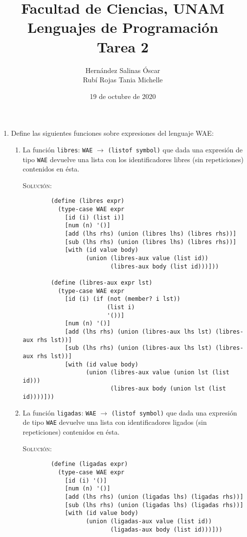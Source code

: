 \documentclass[letterpaper,11pt]{article}
\title{Facultad de Ciencias, UNAM \\ 
       Lenguajes de Programación \\ 
       Tarea 2}
\author{Hernández Salinas Óscar \\ 
        Rubí Rojas Tania Michelle }
\date{19 de octubre de 2020}
\begin{document}
\maketitle

\begin{enumerate}
    \item Define las siguientes funciones sobre expresiones del lenguaje WAE:
    \begin{enumerate}
        \item La función \texttt{libres}: \texttt{WAE} $\rightarrow$ 
        \texttt{(listof symbol)} que dada una expresión de tipo
        \texttt{WAE} devuelve una lista con los identificadores libres (sin 
        repeticiones) contenidos en ésta.

        \textsc{Solución:}
        \begin{verbatim}
        (define (libres expr)
          (type-case WAE expr
            [id (i) (list i)]
            [num (n) '()]
            [add (lhs rhs) (union (libres lhs) (libres rhs))]
            [sub (lhs rhs) (union (libres lhs) (libres rhs))]
            [with (id value body)
                  (union (libres-aux value (list id)) 
                         (libres-aux body (list id)))]))

        (define (libres-aux expr lst)
          (type-case WAE expr
            [id (i) (if (not (member? i lst))
                        (list i)
                        '())]
            [num (n) '()]
            [add (lhs rhs) (union (libres-aux lhs lst) (libres-aux rhs lst))]
            [sub (lhs rhs) (union (libres-aux lhs lst) (libres-aux rhs lst))]
            [with (id value body)
                  (union (libres-aux value (union lst (list id)))
                         (libres-aux body (union lst (list id))))]))
        \end{verbatim}

        \newpage
        \item La función \texttt{ligadas}: \texttt{WAE} $\rightarrow$
        \texttt{(listof symbol)} que dada una expresión de tipo
        \texttt{WAE} devuelve una lista con identificadores ligados (sin
        repeticiones) contenidos en ésta.

        \textsc{Solución:}
        \begin{verbatim}
        (define (ligadas expr)
          (type-case WAE expr
            [id (i) '()]
            [num (n) '()]
            [add (lhs rhs) (union (ligadas lhs) (ligadas rhs))]
            [sub (lhs rhs) (union (ligadas lhs) (ligadas rhs))]
            [with (id value body)
                  (union (ligadas-aux value (list id)) 
                         (ligadas-aux body (list id)))]))
        

\end{verbatim}
\end{enumerate}
\end{enumerate}
\end{document}
